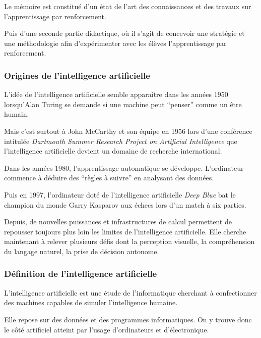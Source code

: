 \documentclass[
12pt,
french,
]{article}
\begin{document}
Le mémoire est constitué d'un état de l'art des connaissances et des
travaux sur l'apprentissage par renforcement.

Puis d'une seconde partie didactique, où il s'agit de concevoir une
stratégie et une méthodologie afin d'expérimenter avec les élèves
l'apprentissage par renforcement.

\hypertarget{origines-de-lintelligence-artificielle}{%
\subsubsection{Origines de l'intelligence
artificielle}\label{origines-de-lintelligence-artificielle}}

\hspace{0pt}L'idée de l'intelligence artificielle semble apparaître dans
les années 1950 lorsqu'Alan Turing se demande si une machine peut
``penser'' comme un être humain.

Mais c'est surtout à John McCarthy et son équipe en 1956 lors d'une
conférence intitulée \emph{Dartmouth Summer Research Project on
Artificial Intelligence} que l'intelligence artificielle devient un
domaine de recherche international.

Dans les années 1980, l'apprentissage automatique se développe.
L'ordinateur commence à déduire des ``règles à suivre'' en analysant des
données.

Puis en 1997, l'ordinateur doté de l'intelligence artificielle
\emph{Deep Blue} bat le champion du monde Garry Kasparov aux échecs lors
d'un match à six parties.

Depuis, de nouvelles puissances et infrastructures de calcul permettent
de repousser toujours plus loin les limites de l'intelligence
artificielle. Elle cherche maintenant à relever plusieurs défis dont la
perception visuelle, la compréhension du langage naturel, la prise de
décision autonome.

\hypertarget{duxe9finition-de-lintelligence-artificielle}{%
\subsubsection{Définition de l'intelligence
artificielle}\label{duxe9finition-de-lintelligence-artificielle}}

L'intelligence artificielle est une étude de l'informatique cherchant à
confectionner des machines capables de simuler l'intelligence humaine.

Elle repose sur des données et des programmes informatiques. On y trouve
donc le côté artificiel atteint par l'usage d'ordinateurs et
d'électronique.
\end{document}
